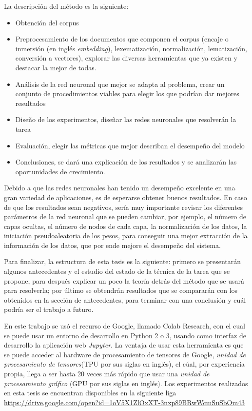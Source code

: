 \par La descripción del método es la siguiente:
\begin{itemize}
	\item Obtención del corpus
	\item Preprocesamiento de los documentos que componen el corpus (encaje o inmersión (en inglés \textit{embedding}), lexematización, normalización, lematización, conversión a vectores), explorar las diversas herramientas que ya existen y destacar la mejor de todas.
	\item Análisis de la red neuronal que mejor se adapta al problema, crear un conjunto de procedimientos viables para elegir los que podrían dar mejores resultados
	\item Diseño de los experimentos, diseñar las redes neuronales que resolverán la tarea
	\item Evaluación, elegir las métricas que mejor describan el desempeño del modelo
	\item Conclusiones, se dará una explicación de los resultados y se analizarán las oportunidades de crecimiento.
\end{itemize}

\par Debido a que las redes neuronales han tenido un desempeño excelente en una gran variedad de aplicaciones, es de esperarse obtener buenos resultados. En caso de que los resultados sean negativos, sería muy importante revisar los diferentes parámetros de la red neuronal que se pueden cambiar, por ejemplo, el número de capas ocultas, el número de nodos de cada capa, la normalización de los datos, la iniciación pseudoaleatoria de los pesos, para conseguir una mejor extracción de la información de los datos, que por ende mejore el desempeño del sistema.

\par Para finalizar, la estructura de esta tesis es la siguiente: primero se presentarán algunos antecedentes y el estudio del estado de la técnica de la tarea que se propone, para después explicar un poco la teoría detrás del método que se usará para resolverla; por último se obtendrán resultados que se compararán con los obtenidos en la sección de antecedentes, para terminar con una conclusión y cuál podría ser el trabajo a futuro.

\par En este trabajo se usó el recurso de Google, llamado Colab Research, con el cual se puede usar un entorno de desarrollo en Python 2 o 3, usando como interfaz de desarrollo la aplicación web \textit{Jupyter}. La ventaja de usar esta herramienta es que se puede acceder al hardware de procesamiento de tensores de Google, \textit{unidad de procesamiento de tensores}(TPU por sus siglas en inglés), el cúal, por experiencia propia, llega a ser hasta 20 veces más rápido que usar una \textit{unidad de procesamiento gráfico} (GPU por sus siglas en inglés). Los experimentos realizados en esta tesis se encuentran disponibles en la siguiente liga \href{ https://drive.google.com/open?id=1oV5X1ZlOxXT-3nxp89BRwWcmSuSbOm43}{https://drive.google.com/open?id=1oV5X1ZlOxXT-3nxp89BRwWcmSuSbOm43}